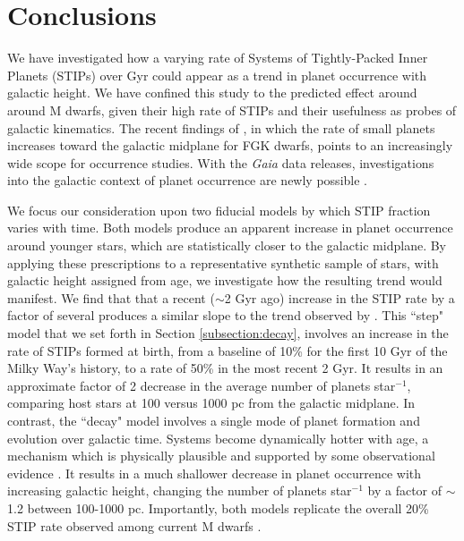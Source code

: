 \documentclass[twocolumn]{aastex631}
\begin{document}
\section{Conclusions}
 We have investigated how a varying rate of Systems of Tightly-Packed Inner Planets (STIPs) over Gyr could appear as a trend in planet occurrence with galactic height. We have confined this study to the predicted effect around around M dwarfs, given their high rate of STIPs and their usefulness as probes of galactic kinematics. The recent findings of \cite{zink_scaling_2023}, in which the rate of small planets increases toward the galactic midplane for FGK dwarfs, points to an increasingly wide scope for occurrence studies. With the \textit{Gaia} data releases, investigations into the galactic context of planet occurrence are newly possible \citep{winter_planet_2024, longmore_impact_2021, kruijssen_bridging_2020, adibekyan_stellar_2021, bashi_small_2019, dai_planet_2021}. 

We focus our consideration upon two fiducial models by which STIP fraction varies with time. Both models produce an apparent increase in planet occurrence around younger stars, which are statistically closer to the galactic midplane. By applying these prescriptions to a representative synthetic sample of stars, with galactic height assigned from age, we investigate how the resulting trend would manifest. We find that that a recent ($\sim$2 Gyr ago) increase in the STIP rate by a factor of several produces a similar slope to the trend observed by \cite{zink_scaling_2023}.  This ``step" model that we set forth in Section \ref{subsection:decay}, involves an increase in the rate of STIPs formed at birth, from a baseline of 10\%  for the first 10 Gyr of the Milky Way's history, to a rate of 50\% in the most recent 2 Gyr. It results in an approximate factor of 2 decrease in the average number of planets star$^{-1}$, comparing host stars at 100 versus 1000 pc from the galactic midplane. In contrast, the ``decay" model involves a single mode of planet formation and evolution over galactic time. Systems become dynamically hotter with age, a mechanism which is physically plausible \citep{Pu15, zinzi_anti-correlation_2017} and supported by some observational evidence \citep{yang_planets_2023}. It results in a much shallower decrease in planet occurrence with increasing galactic height, changing the number of planets star$^{-1}$ by a factor of $\sim$1.2 between 100-1000 pc. Importantly, both models replicate the overall 20\% STIP rate observed among current M dwarfs \citep{Ballard16, Muirhead15}. 
\end{document}
